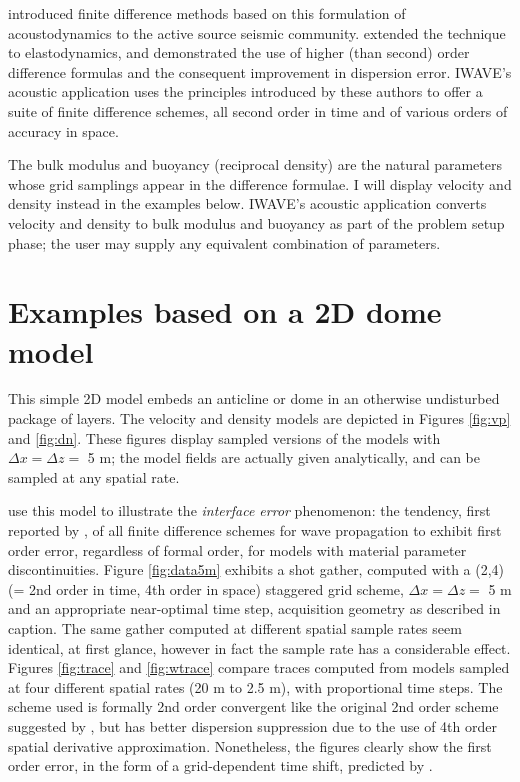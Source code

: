 \cite{Vir:84} introduced finite difference methods based on this
formulation of acoustodynamics to the active source seismic
community. \cite{Vir:86} extended the technique to elastodynamics, and
\cite{Lev:88} demonstrated the use of higher (than second) order
difference formulas and the consequent improvement in dispersion
error.  IWAVE's acoustic application uses the principles introduced by
these authors to offer a suite of finite difference schemes, all
second order in time and of various orders of accuracy in space.

The bulk modulus and buoyancy (reciprocal density) are the natural
parameters whose grid samplings appear in the difference formulae. I will
display velocity and density instead in the examples below. IWAVE's acoustic application
converts velocity and density to bulk modulus and buoyancy as part of
the problem setup phase; the user may supply any equivalent combination of parameters.

\section{Examples based on a 2D dome model}

This simple 2D model embeds an anticline or dome in an otherwise
undisturbed package of layers. The velocity and density models are
depicted in Figures \ref{fig:vp} and \ref{fig:dn}. These
figures display sampled versions of the models with $\Delta x = \Delta
z = $ 5 m; the model fields are actually given analytically, and can
be sampled at any spatial rate.

\cite{SymesVdovina:09} use this model to illustrate the {\em
  interface error} phenomenon: the tendency, first reported by
\cite{Brown:84}, of all finite difference schemes for wave
propagation to exhibit first order error, regardless of formal order,
for models with material parameter discontinuities. 
Figure \ref{fig:data5m} exhibits a shot gather, computed with a (2,4) (= 2nd order in time,
4th order in space) staggered grid scheme, $\Delta
x = \Delta z = $ 5 m and an appropriate near-optimal time step, acquisition geometry as described in
caption. The same gather computed at different spatial sample rates
seem identical, at first glance, however in fact the sample rate has a considerable effect. Figures
\ref{fig:trace} and \ref{fig:wtrace} compare traces computed from models sampled
at four different spatial rates (20 m to 2.5 m), with proportional
time steps. The scheme used is formally 2nd order
convergent like the original 2nd order scheme suggested by
\cite{Vir:84}, but has better dispersion suppression due to the use of
4th order spatial derivative approximation. Nonetheless,
the figures clearly show the first order error, in the form of a
grid-dependent time shift, predicted by \cite{Brown:84}. 

